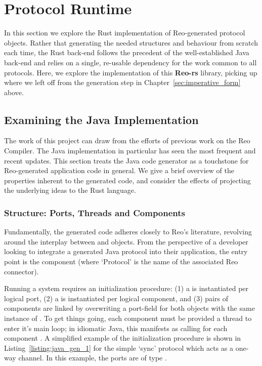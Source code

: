 \chapter{Protocol Runtime}
\label{sec:protocol_runtime}
In this section we explore the Rust implementation of Reo-generated protocol objects. Rather that generating the needed structures and behaviour from scratch each time, the Rust back-end follows the precedent of the well-established Java back-end and relies on a single, re-usable dependency for the work common to all protocols. Here, we explore the implementation of this \textbf{Reo-rs} library, picking up where we left off from the generation step in Chapter~\ref{sec:imperative_form} above.

\section{Examining the Java Implementation}
\label{sec:java_examined}
The work of this project can draw from the efforts of previous work on the Reo Compiler. The Java implementation in particular has seen the most frequent and recent updates. This section treats the Java code generator as a touchstone for Reo-generated application code in general. We give a brief overview of the properties inherent to the generated code, and consider the effects of projecting the underlying ideas to the Rust language.

\subsection{Structure: Ports, Threads and Components}
Fundamentally, the generated code adheres closely to Reo's literature, revolving around the interplay between  and  objects. From the perspective of a developer looking to integrate a generated Java protocol into their application, the entry point is the  component (where `Protocol' is the name of the associated Reo connector).

Running a system requires an initialization procedure: (1) a  is instantiated per logical port, (2) a  is instantiated per logical component, and (3) pairs of components are linked by overwriting a port-field for both objects with the same instance of . To get things going, each component must be provided a thread to enter it's main loop; in idiomatic Java, this manifests as calling  for each component . A simplified example of the initialization procedure is shown in Listing~\ref{listing:java_gen_1} for the simple `sync' protocol which acts as a one-way channel. In this example, the ports are of type .


